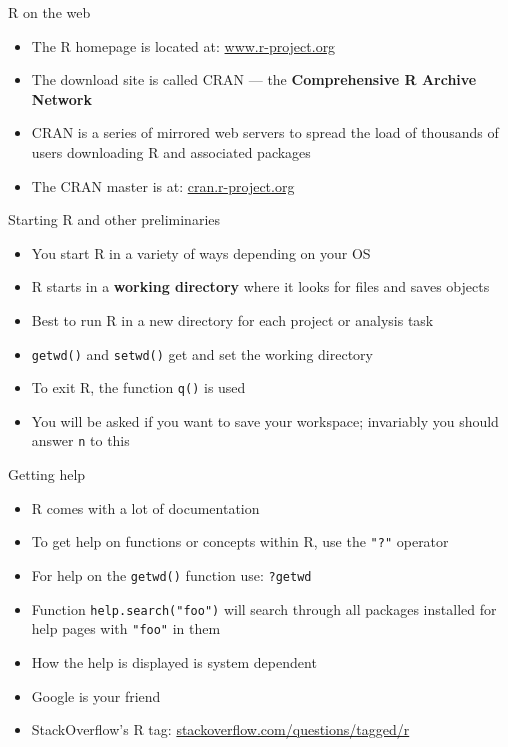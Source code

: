 \documentclass[10pt,ignorenonframetext,compress, aspectratio=169]{beamer}
\providecommand{\tightlist}{%
  \setlength{\itemsep}{0pt}\setlength{\parskip}{0pt}}
\begin{document}
\begin{frame}{R on the web}

\begin{itemize}
\tightlist
\item
  The R homepage is located at:
  \href{http://www.r-project.org}{www.r-project.org}
\item
  The download site is called CRAN --- the \textbf{Comprehensive R
  Archive Network}
\item
  CRAN is a series of mirrored web servers to spread the load of
  thousands of users downloading R and associated packages
\item
  The CRAN master is at:
  \href{http://cran.r-project.org}{cran.r-project.org}
\end{itemize}

\end{frame}

\begin{frame}[fragile]{Starting R and other preliminaries}

\begin{itemize}
\tightlist
\item
  You start R in a variety of ways depending on your OS
\item
  R starts in a \textbf{working directory} where it looks for files and
  saves objects
\item
  Best to run R in a new directory for each project or analysis task
\item
  \texttt{getwd()} and \texttt{setwd()} get and set the working
  directory
\item
  To exit R, the function \texttt{q()} is used
\item
  You will be asked if you want to save your workspace; invariably you
  should answer \texttt{n} to this
\end{itemize}

\end{frame}

\begin{frame}[fragile]{Getting help}

\begin{itemize}
\tightlist
\item
  R comes with a lot of documentation
\item
  To get help on functions or concepts within R, use the \texttt{"?"}
  operator
\item
  For help on the \texttt{getwd()} function use: \texttt{?getwd}
\item
  Function \texttt{help.search("foo")} will search through all packages
  installed for help pages with \texttt{"foo"} in them
\item
  How the help is displayed is system dependent
\item
  Google is your friend
\item
  StackOverflow's R tag:
  \href{http://stackoverflow.com/questions/tagged/r}{stackoverflow.com/questions/tagged/r}
\end{itemize}

\end{frame}
\end{document}
